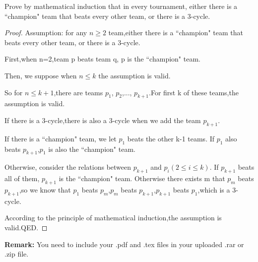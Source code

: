 \documentclass[12pt,a4paper]{article}
\theoremstyle{definition}
\begin{document}
\begin{enumerate}
Prove by mathematical induction that in every tournament, either there is a ``champion" team that beats every other team, or there is a 3-cycle. 
    \begin{proof}
        Assumption: for any $n\geq2$ team,either there is a ``champion" team that beats every other team, or there is a 3-cycle. 
        \par First,when n=2,team p beats team q, p is the ``champion" team.
        \par Then, we suppose when $n\leq k$ the assumption is valid.
        \par So for  $n\leq k+1$,there are teams $p_{1}$, $p_{2}$,..., $p_{k+1}$.For first k of these teams,the assumption is valid. 
        \par If there is a 3-cycle,there is also a  3-cycle when we add the team $p_{k+1}$.
        \par If there is a ``champion" team, we let $p_1$ beats the other k-1 teams. If $p_1$ also beats $p_{k+1}$,$p_1$ is also the ``champion" team. 
        \par Otherwise, consider the relations between $p_{k+1}$ and $p_i(2\leq i\leq k)$. If $p_{k+1}$ beats all of them, $p_{k+1}$ is the ``champion" team. Otherwise there exists m that $p_m$ beats $p_{k+1}$,so we know that $p_1$ beats $p_m$,$p_m$ beats $p_{k+1}$,$p_{k+1}$ beats $p_1$,which is a 3-cycle. 
        \par According to the principle of mathematical induction,the assumption is valid.QED.    
    \end{proof}

\end{enumerate}

\vspace{20pt}

\textbf{Remark:} You need to include your .pdf and .tex files in your uploaded .rar or .zip file.

\end{document}
